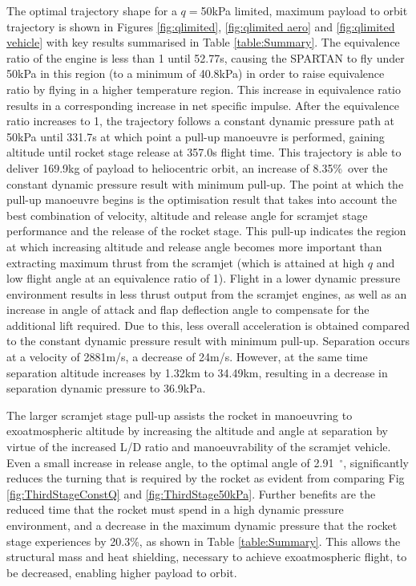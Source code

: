 \documentclass[]{aiaa-tc}
\newcommand{\PayloadImprovement}{8.35\%}
\newcommand{\qDecrease}{20.3\%}
\newcommand{\PayloadToOrbitFiftykPa}{169.9}
\newcommand{\SeparationAltFiftykPa}{34.49}
\newcommand{\SeparationvFiftykPa}{2881}
\newcommand{\SeparationAngleFiftykPa}{2.91}
\newcommand{\SeparationqFiftykPa}{36.9}
\newcommand{\FlightTimeFiftykPa}{357.0}
\begin{document}
 
The optimal trajectory shape for a $q=$50kPa limited, maximum payload to orbit trajectory is shown in Figures \ref{fig:qlimited}, \ref{fig:qlimited aero} and \ref{fig:qlimited vehicle} with key results summarised in Table \ref{table:Summary}. 
The equivalence ratio of the engine is less than 1 until 52.77s, causing the SPARTAN to fly under 50kPa in this region (to a minimum of 40.8kPa) in order to raise equivalence ratio by flying in a higher temperature region. This increase in equivalence ratio results in a corresponding increase in net specific impulse.
 After the equivalence ratio increases to 1, the trajectory follows a constant dynamic pressure path at 50kPa until 331.7s at which point a pull-up manoeuvre is performed, gaining altitude until rocket stage release at \FlightTimeFiftykPa s flight time. 
 This trajectory is able to deliver \PayloadToOrbitFiftykPa kg of payload to heliocentric orbit, an increase of \PayloadImprovement\ over the constant dynamic pressure result with minimum pull-up. The point at which the pull-up manoeuvre begins is the optimisation result that takes into account the best combination of velocity, altitude and release angle for scramjet stage performance and the release of the rocket stage. This pull-up indicates the region at which increasing altitude and release angle becomes more important than extracting maximum thrust from the scramjet (which is attained at high $q$ and low flight angle at an equivalence ratio of 1).
 Flight in a lower dynamic pressure environment results in less thrust output from the scramjet engines, as well as an increase in angle of attack and flap deflection angle to compensate for the additional lift required. Due to this, less overall acceleration is obtained compared to the constant dynamic pressure result with minimum pull-up. Separation occurs at a velocity of \SeparationvFiftykPa m/s, a decrease of 24m/s. However, at the same time separation altitude increases by 1.32km to \SeparationAltFiftykPa km, resulting in a decrease in separation dynamic pressure to \SeparationqFiftykPa kPa. 

The larger scramjet stage pull-up assists the rocket in manoeuvring to exoatmospheric altitude by increasing the altitude and angle at separation by virtue of the increased L/D ratio and manoeuvrability of the scramjet vehicle. Even a small increase in release angle, to the optimal angle of \SeparationAngleFiftykPa~$^\circ$, significantly reduces the turning that is required by the rocket as evident from comparing Fig \ref{fig:ThirdStageConstQ} and \ref{fig:ThirdStage50kPa}. Further benefits are the reduced time that the rocket must spend in a high dynamic pressure environment, and a decrease in the maximum dynamic pressure that the rocket stage experiences by \qDecrease, as shown in Table \ref{table:Summary}. This allows the structural mass and heat shielding, necessary to achieve exoatmospheric flight, to be decreased, enabling higher payload to orbit. 
\end{document}
